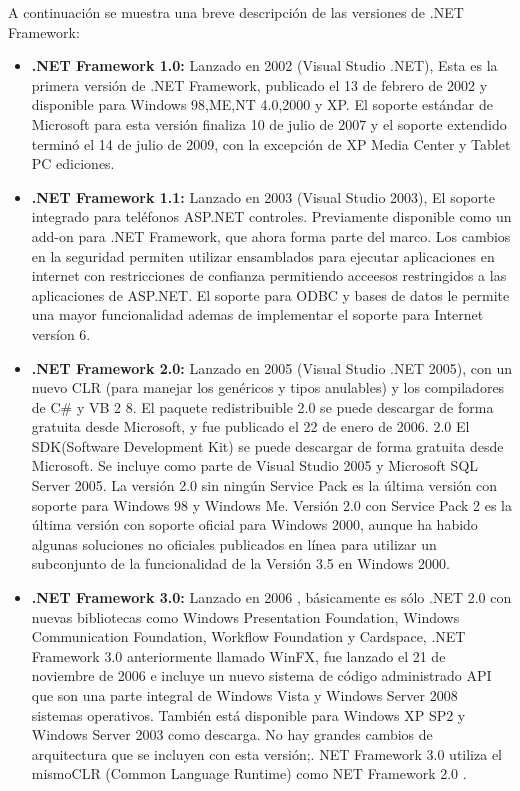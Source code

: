 		A continuaci\'on se muestra una breve descripci\'on de las versiones de .NET Framework:

		\begin{itemize}
			\item \textbf{.NET Framework 1.0: } Lanzado en 2002 (Visual Studio .NET), Esta es la primera versi\'on de .NET Framework, publicado el 13 de febrero de 2002 y disponible para Windows 98,ME,NT 4.0,2000 y XP. El soporte est\'andar de Microsoft para esta versi\'on finaliza 10 de julio de 2007 y el soporte extendido termin\'o el 14 de julio de 2009, con la excepci\'on de XP Media Center y Tablet PC ediciones. 

			\item \textbf{.NET Framework 1.1: } Lanzado en 2003 (Visual Studio 2003), El soporte integrado para tel\'efonos ASP.NET controles. Previamente disponible como un add-on para .NET Framework, que ahora forma parte del marco. Los cambios en la seguridad permiten utilizar ensamblados  para ejecutar aplicaciones en internet con restricciones de confianza permitiendo acceesos restringidos  a las aplicaciones de ASP.NET. El soporte para ODBC y bases de datos le permite una mayor funcionalidad ademas de implementar el soporte para Internet vers\'ion  6.

			\item \textbf{.NET Framework 2.0: } Lanzado en 2005 (Visual Studio .NET 2005), con un nuevo CLR (para manejar los gen\'ericos y tipos anulables) y los compiladores de C\# y VB 2 8.
			El paquete redistribuible 2.0 se puede descargar de forma gratuita desde Microsoft, y fue publicado el 22 de enero de 2006. 2.0 El SDK(Software Development Kit) se puede descargar de forma gratuita desde Microsoft. Se incluye como parte de Visual Studio 2005 y Microsoft SQL Server 2005. La versi\'on 2.0 sin ning\'un Service Pack es la \'ultima versi\'on con soporte para Windows 98 y Windows Me. Versi\'on 2.0 con Service Pack 2 es la \'ultima versi\'on con soporte oficial para Windows 2000, aunque ha habido algunas soluciones no oficiales publicados en l\'inea para utilizar un subconjunto de la funcionalidad de la Versi\'on 3.5 en Windows 2000. 

			\item \textbf{.NET Framework 3.0: } Lanzado en 2006 , b\'asicamente es s\'olo .NET 2.0 con nuevas bibliotecas como Windows Presentation Foundation, Windows Communication Foundation, Workflow Foundation y Cardspace, .NET Framework 3.0  anteriormente llamado WinFX, fue lanzado el 21 de noviembre de 2006 e incluye un nuevo sistema de c\'odigo administrado API que son una parte integral de Windows Vista y Windows Server 2008 sistemas operativos. También está disponible para Windows XP SP2 y Windows Server 2003 como descarga. No hay grandes cambios de arquitectura que se incluyen con esta versi\'on;. NET Framework 3.0 utiliza el mismoCLR (Common Language Runtime) como NET Framework 2.0 . 


\end{itemize}
